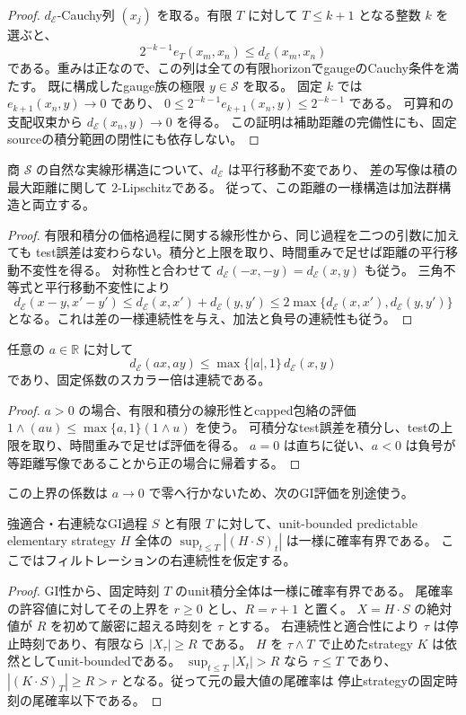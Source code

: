 \begin{proof}
$d_{\mathcal E}$-Cauchy列 $(x_j)$ を取る。有限 $T$ に対して $T\le k+1$ となる整数 $k$ を選ぶと、
\[
 2^{-k-1}e_T(x_m,x_n)\le d_{\mathcal E}(x_m,x_n)
\]
である。重みは正なので、この列は全ての有限horizonでgaugeのCauchy条件を満たす。
既に構成したgauge族の極限 $y\in\mathcal S$ を取る。
固定 $k$ では $e_{k+1}(x_n,y)\to0$ であり、
$0\le2^{-k-1}e_{k+1}(x_n,y)\le2^{-k-1}$ である。
可算和の支配収束から $d_{\mathcal E}(x_n,y)\to0$ を得る。
この証明は補助距離の完備性にも、固定sourceの積分範囲の閉性にも依存しない。
\end{proof}
\begin{proposition}[elementary距離と加法構造]
商 $\mathcal S$ の自然な実線形構造について、$d_{\mathcal E}$ は平行移動不変であり、
差の写像は積の最大距離に関して $2$-Lipschitzである。
従って、この距離の一様構造は加法群構造と両立する。
\end{proposition}
\begin{proof}
有限和積分の価格過程に関する線形性から、同じ過程を二つの引数に加えても
test誤差は変わらない。積分と上限を取り、時間重みで足せば距離の平行移動不変性を得る。
対称性と合わせて $d_{\mathcal E}(-x,-y)=d_{\mathcal E}(x,y)$ も従う。
三角不等式と平行移動不変性により
\[
 d_{\mathcal E}(x-y,x'-y')
 \le d_{\mathcal E}(x,x')+d_{\mathcal E}(y,y')
 \le2\max\{d_{\mathcal E}(x,x'),d_{\mathcal E}(y,y')\}
\]
となる。これは差の一様連続性を与え、加法と負号の連続性も従う。
\end{proof}
\begin{proposition}[固定係数のスカラー倍]
任意の $a\in\mathbb R$ に対して
\[
 d_{\mathcal E}(ax,ay)\le\max\{|a|,1\}\,d_{\mathcal E}(x,y)
\]
であり、固定係数のスカラー倍は連続である。
\end{proposition}
\begin{proof}
$a>0$ の場合、有限和積分の線形性とcapped包絡の評価
$1\wedge(au)\le\max\{a,1\}(1\wedge u)$ を使う。
可積分なtest誤差を積分し、testの上限を取り、時間重みで足せば評価を得る。
$a=0$ は直ちに従い、$a<0$ は負号が等距離写像であることから正の場合に帰着する。
\end{proof}
この上界の係数は $a\to0$ で零へ行かないため、次のGI評価を別途使う。

\begin{lemma}[unit積分の最大値の一様確率有界性]
強適合・右連続なGI過程 $S$ と有限 $T$ に対して、unit-bounded predictable elementary
strategy $H$ 全体の $\sup_{t\le T}|(H\cdot S)_t|$ は一様に確率有界である。
ここではフィルトレーションの右連続性を仮定する。
\end{lemma}
\begin{proof}
GI性から、固定時刻 $T$ のunit積分全体は一様に確率有界である。
尾確率の許容値に対してその上界を $r\ge0$ とし、$R=r+1$ と置く。
$X=H\cdot S$ の絶対値が $R$ を初めて厳密に超える時刻を $\tau$ とする。
右連続性と適合性により $\tau$ は停止時刻であり、有限なら $|X_\tau|\ge R$ である。
$H$ を $\tau\wedge T$ で止めたstrategy $K$ は依然としてunit-boundedである。
$\sup_{t\le T}|X_t|>R$ なら $\tau\le T$ であり、
$|(K\cdot S)_T|\ge R>r$ となる。従って元の最大値の尾確率は
停止strategyの固定時刻の尾確率以下である。
\end{proof}

